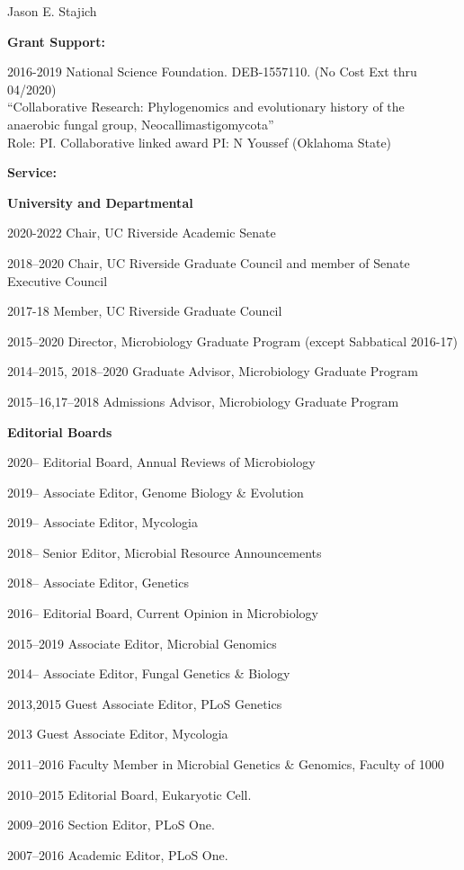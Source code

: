 \documentclass[10pt]{article}
\begin{document}
\begin{cv}{\centerline{Jason E. Stajich}}
\begin{cvlistcompact}{\bf Grant Support:}
\item [2016-2019] National Science Foundation. DEB-1557110. (No Cost Ext thru 04/2020) \\
``Collaborative Research: Phylogenomics and evolutionary history of the anaerobic fungal group, Neocallimastigomycota'' \\
Role: PI. Collaborative linked award PI: N Youssef (Oklahoma State)

\end{cvlistcompact}

\setlength{\cvlabelwidth}{18mm}

\begin{cvlistcompact}{\bf Service:}
\item[{\bf University and Departmental}]
\item[2020-2022] Chair, UC Riverside Academic Senate
\item [2018--2020] Chair, UC Riverside Graduate Council and member of Senate Executive Council
\item [2017-18] Member, UC Riverside Graduate Council
\item [2015--2020] Director, Microbiology Graduate Program (except Sabbatical 2016-17)
\item [2014--2015, 2018--2020] Graduate Advisor, Microbiology Graduate Program
\item [2015--16,17--2018] Admissions Advisor, Microbiology Graduate Program
\\

\item[{\bf Editorial Boards}]
\item [2020--] Editorial Board, Annual Reviews of Microbiology
\item [2019--] Associate Editor, Genome Biology \& Evolution
\item [2019--] Associate Editor, Mycologia
\item [2018--] Senior Editor, Microbial Resource Announcements
\item [2018--] Associate Editor, Genetics
\item [2016--] Editorial Board, Current Opinion in Microbiology
\item [2015--2019] Associate Editor, Microbial Genomics
\item [2014--] Associate Editor, Fungal Genetics \& Biology
\item [2013,2015] Guest Associate Editor, PLoS Genetics
\item [2013] Guest Associate Editor, Mycologia
\item [2011--2016] Faculty Member in Microbial Genetics \& Genomics,
  Faculty of 1000
\item [2010--2015] Editorial Board, Eukaryotic Cell.
\item [2009--2016] Section Editor, PLoS One.
\item [2007--2016] Academic Editor, PLoS One.
\\


\end{cvlistcompact}
\end{cv}
\end{document}
